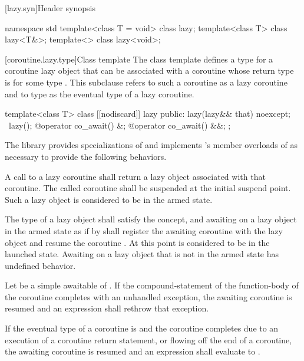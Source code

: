 {[lazy.syn]{Header  synopsis}
\begin{codeblock}
namespace std {
  template<class T = void> class lazy;
  template<class T> class lazy<T&>;
  template<> class lazy<void>;
}
\end{codeblock}

[coroutine.lazy.type]{Class template }
\pnum
The class template  defines
a type for a coroutine lazy object
that can be associated with
a coroutine whose return type is
 for some type .
This subclause refers to such a coroutine as a lazy coroutine
and to type  as the eventual type of a lazy coroutine.

\begin{codeblock}
template<class T>
  class [[nodiscard]] lazy {
  public:
    lazy(lazy&& that) noexcept;
    ~lazy();
    @\unspec@ operator co_await() &;
    @\unspec@ operator co_await() &&;
  };
\end{codeblock}

\pnum
The library provides specializations of 
and implements 's member overloads of 
as necessary to provide the following behaviors.

\pnum
A call to a lazy coroutine  shall return a lazy object  associated with that coroutine. The called coroutine shall be suspended at the initial suspend point. Such a lazy object is considered to be in the armed state.

\pnum
The type of a lazy object shall satisfy the  concept, and awaiting on a lazy object in the armed state as if by  shall register the awaiting coroutine  with the lazy object  and resume the coroutine . At this point  is considered to be in the launched state. Awaiting on a lazy object that is not in the armed state has undefined behavior.

\pnum
Let  be a simple awaitable of . If the compound-statement of the function-body of the coroutine  completes with an unhandled exception, the awaiting coroutine  is resumed and an expression  shall rethrow that exception.

\pnum
If the eventual type of a coroutine  is  and the coroutine completes due to an execution of a coroutine return statement, or flowing off the end of a coroutine, the awaiting coroutine  is resumed and an expression  shall evaluate to .

}
